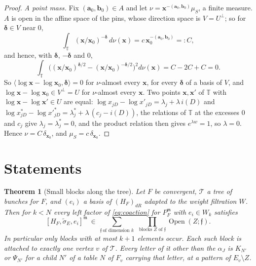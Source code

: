 \documentclass[11pt]{article}
\theoremstyle{plain}
\newtheorem{theorem}{Theorem}
\theoremstyle{definition}
\theoremstyle{remark}
\newcommand{\cT}{\mathcal T}
\newcommand{\TT}{\mathbb T}
\newcommand{\m}{\mathfrak m}
\newcommand{\bx}{\mathbf x}
\newcommand{\ff}{\mathfrak f}
\newcommand{\Open}{\operatorname{Open}}
\newcommand{\tsig}{\widetilde\sigma}
\begin{document}
\begin{proof}
\emph{A point mass.} Fix $(\mathbf a_0,\mathbf b_0)\in A$ and let $\nu=\bx^{-(\mathbf a_0,\mathbf b_0)}\mu_S$, a finite measure. $A$ is open in the affine space of the pins, whose direction space is $V=U^\perp$; so for $\boldsymbol\delta\in V$ near $0$,
\[
\int_{\TT}(\bx/\bx_0)^{-\boldsymbol\delta}\,d\nu(\bx)=c\,\bx_0^{-(\mathbf a_0,\mathbf b_0)}=:C,
\]
and hence, with $\boldsymbol\delta$, $-\boldsymbol\delta$ and $0$,
\[
\int_{\TT}\Big((\bx/\bx_0)^{\boldsymbol\delta/2}-(\bx/\bx_0)^{-\boldsymbol\delta/2}\Big)^2d\nu(\bx)=C-2C+C=0 .
\]
So $\langle\log\bx-\log\bx_0,\boldsymbol\delta\rangle=0$ for $\nu$-almost every $\bx$, for every $\boldsymbol\delta$ of a basis of $V$, and $\log\bx-\log\bx_0\in V^\perp=U$ for $\nu$-almost every $\bx$. Two points $\bx,\bx'$ of $\TT$ with $\log\bx-\log\bx'\in U$ are equal: $\log x_{jD}-\log x'_{jD}=\lambda_j+\lambda\,i(D)$ and $\log x^\ast_{jD}-\log x'^\ast_{jD}=\lambda^\ast_j+\lambda\,(c_j-i(D))$, the relations of $\TT$ at the excesses $0$ and $c_j$ give $\lambda_j=\lambda^\ast_j=0$, and the product relation then gives $e^{\lambda w}=1$, so $\lambda=0$. Hence $\nu=C\,\delta_{\bx_0}$, and $\mu_S=c\,\delta_{\bx_0}$.
\end{proof}

\section{Statements}\label{sec:statements}

\begin{theorem}[Small blocks along the tree]\label{thm:A}
Let $F$ be convergent, $\cT$ a tree of bunches for $F$, and $(e_i)$ a basis of $(H_F)_{dR}$ adapted to the weight filtration $W$. Then for $k<N$ every left factor of \eqref{eq:coaction} for $P_F^{\m}$ with $e_i\in W_k$ satisfies
\[
[H_F,\tsig_E,e_i]^{\m}\ \in\ \sum_{\ff\ \text{of dimension }k}\ \ \prod_{\text{blocks }Z\text{ of }\ff}\Open(Z;\ff).
\]
In particular only blocks with at most $k+1$ elements occur. Each such block is attached to exactly one vertex $v$ of $\cT$. Every letter of it other than the $\alpha_J$ is $K_{N'}$ or $\Psi_{N'}$ for a child $N'$ of a table $N$ of $F_v$ carrying that letter, at a pattern of $E_v\setminus Z$.
\end{theorem}
\end{document}
